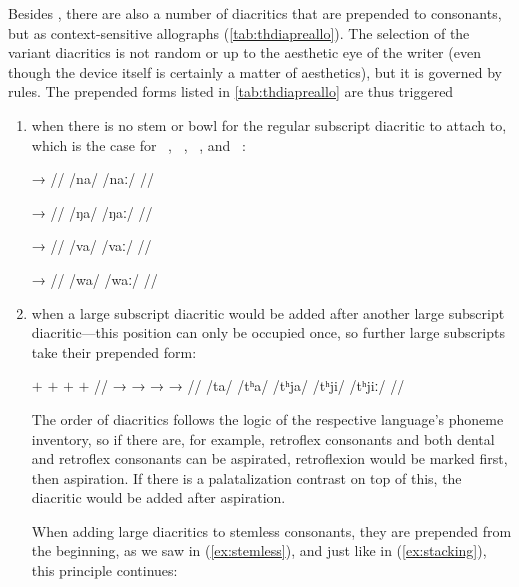 Besides , there are also a number of diacritics that are prepended to
consonants, but as context-sensitive allographs (\autoref{tab:thdiapreallo}).
The selection of the variant diacritics is not random or up to the aesthetic
eye of the writer (even though the device itself is certainly a matter of
aesthetics), but it is governed by rules. The prepended forms listed in
\autoref{tab:thdiapreallo} are thus triggered

\begin{enumerate}
\item when there is no stem or bowl for the regular subscript diacritic to 
	attach to, which is the case for ~, ~, 
	~, and ~:
	
	\begin{multicols}{2}
	\pex[lingstyle=thex,]\label{ex:stemless}
	\a\begingl
		\gla {} →  //
		\glb /na/ {} /naː/ //
	\endgl
	
	\a\begingl
		\gla {} →  //
		\glb /ŋa/ {} /ŋaː/ //
	\endgl
	
	\a\begingl
		\gla {} →  //
		\glb /va/ {} /vaː/ //
	\endgl
	
	\a\begingl
		\gla {} →  //
		\glb /wa/ {} /waː/ //
	\endgl
	
	\xe
	\end{multicols}

\item when a large subscript diacritic would be added after another large 
	subscript diacritic---this position can only be occupied once, so 
	further large subscripts take their prepended form:
	
	\ex[lingstyle=thex,everygla=\normalsize,everyglb=\upshape\Large,
		aboveglcskip=0.5em,numoffset=\leftmargin]\label{ex:stacking}
	\begingl
		\gla {} {$+$ } {} {$+$ } {} {$+$ } {}
			{$+$ } {} //
		\glb {} →  →  →  → 
			 //
		\glc /ta/ {} /tʰa/ {} /tʰja/ {} /tʰji/ {} /tʰjiː/ //
	\endgl\xe
	
	The order of diacritics follows the logic of the respective 
	language's phoneme inventory, so if there are, for example, 
	retroflex consonants and both dental and retroflex consonants can be 
	aspirated, retroflexion would be marked first, then aspiration. If 
	there is a palatalization contrast on top of this, the diacritic would 
	be added after aspiration.
	
	When adding large diacritics to stemless consonants, they are prepended 
	from the beginning, as we saw in (\ref{ex:stemless}), and just like in 
	(\ref{ex:stacking}), this principle continues:
	

\end{enumerate}
